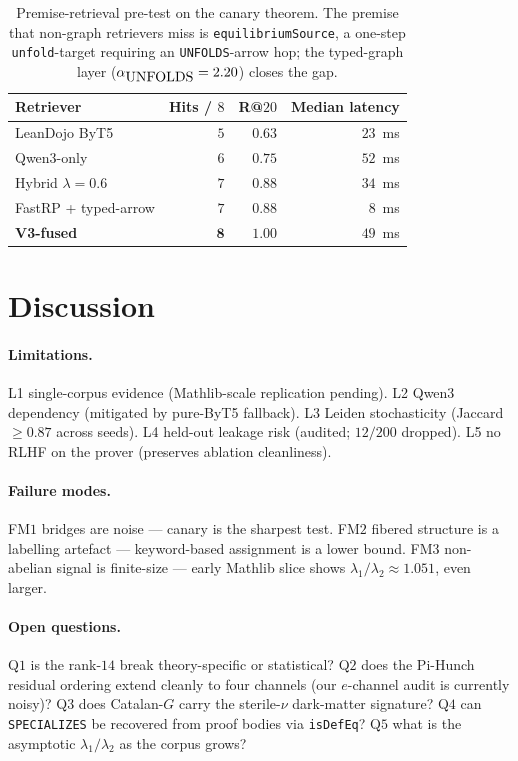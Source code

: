 \documentclass[11pt]{article}
\begin{document}
\begin{table}[h]
\centering\small
\begin{tabular}{l r r r}
\toprule
Retriever & Hits / $8$ & R@$20$ & Median latency \\
\midrule
LeanDojo ByT5           & $5$ & $0.63$          & $23$~ms \\
Qwen$3$-only            & $6$ & $0.75$          & $52$~ms \\
Hybrid $\lambda = 0.6$  & $7$ & $0.88$          & $34$~ms \\
FastRP + typed-arrow    & $7$ & $0.88$          & $\phantom{0}8$~ms \\
\textbf{V3-fused}       & $\mathbf{8}$ & $\mathbf{1.00}$ & $49$~ms \\
\bottomrule
\end{tabular}
\caption{Premise-retrieval pre-test on the canary theorem. The premise
that non-graph retrievers miss is \lstinline|equilibriumSource|, a
one-step \lstinline|unfold|-target requiring an \lstinline|UNFOLDS|-arrow
hop; the typed-graph layer
($\alpha_{\lstinline|UNFOLDS|} = 2.20$) closes the gap.}
\label{tab:canary-retrieval}
\end{table}

\section{Discussion}
\label{sec:discussion}

\paragraph{Limitations.}
L1 single-corpus evidence (Mathlib-scale replication pending).
L2 Qwen3 dependency (mitigated by pure-ByT5 fallback).
L3 Leiden stochasticity (Jaccard $\geq 0.87$ across seeds).
L4 held-out leakage risk (audited; $12/200$ dropped).
L5 no RLHF on the prover (preserves ablation cleanliness).

\paragraph{Failure modes.}
FM$1$ bridges are noise --- canary is the sharpest test.
FM$2$ fibered structure is a labelling artefact --- keyword-based
assignment is a lower bound.
FM$3$ non-abelian signal is finite-size --- early Mathlib slice shows
$\lambda_1/\lambda_2 \approx 1.051$, even larger.

\paragraph{Open questions.}
Q$1$ is the rank-$14$ break theory-specific or statistical?
Q$2$ does the Pi-Hunch residual ordering extend cleanly to four
channels (our $e$-channel audit is currently noisy)?
Q$3$ does Catalan-$G$ carry the sterile-$\nu$ dark-matter signature?
Q$4$ can \lstinline|SPECIALIZES| be recovered from proof bodies via
\lstinline|isDefEq|?
Q$5$ what is the asymptotic $\lambda_1/\lambda_2$ as the corpus grows?
\end{document}

